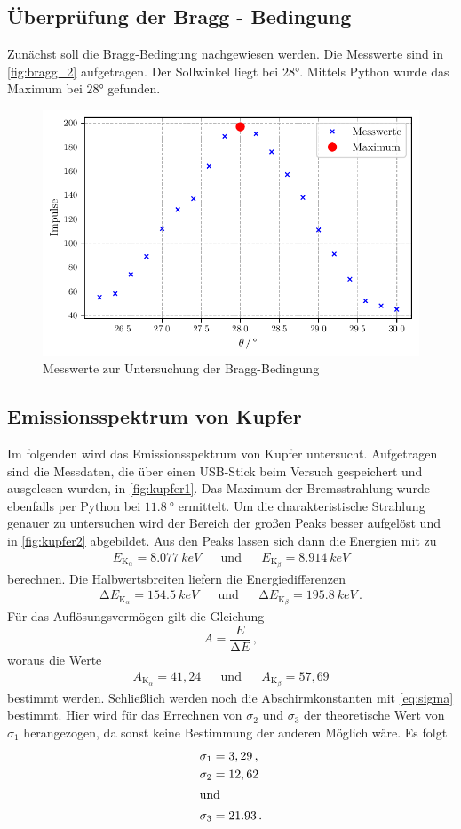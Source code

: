 \subsection{Überprüfung der Bragg - Bedingung}
Zunächst soll die Bragg-Bedingung nachgewiesen werden.
Die Messwerte sind in \autoref{fig:bragg_2} aufgetragen.
Der Sollwinkel liegt bei $28°$.
Mittels Python wurde das Maximum bei $28°$ gefunden.

\begin{figure}
  \centering
  \caption{Messwerte zur Untersuchung der Bragg-Bedingung}
  \label{fig:bragg_2}
  \includegraphics[width=0.5 \linewidth]{build/bragg.pdf}
\end{figure}

\subsection{Emissionsspektrum von Kupfer}
Im folgenden wird das Emissionsspektrum von Kupfer untersucht.
Aufgetragen sind die Messdaten, die über einen USB-Stick beim Versuch gespeichert und ausgelesen wurden, in \autoref{fig:kupfer1}.
Das Maximum der Bremsstrahlung wurde ebenfalls per Python bei $\qty{11.8}{°}$ ermittelt.  
Um die charakteristische Strahlung genauer zu untersuchen wird der Bereich der großen Peaks besser aufgelöst und in \autoref{fig:kupfer2} abgebildet.
Aus den Peaks lassen sich dann die Energien mit zu
\begin{align*}
  E_{\text{K}_\alpha} = \qty{8.077}{keV} &&\text{und}&& E_{\text{K}_\beta} = \qty{8.914}{keV}
\end{align*}
berechnen.
Die Halbwertsbreiten liefern die Energiedifferenzen
\begin{align*}
  \increment E_{\text{K}_\alpha} = \qty{154.5}{keV} &&\text{und}&& \increment E_{\text{K}_\beta} = \qty{195.8}{keV} \, .
\end{align*}
Für das Auflösungsvermögen gilt die Gleichung
\begin{equation*}
  A = \frac{E}{\increment E} \, ,
\end{equation*}
woraus die Werte
\begin{align*}
  A_{\text{K}_\alpha} = 41,24 && \text{und} && A_{\text{K}_\beta} = 57,69
\end{align*}
bestimmt werden.
Schließlich werden noch die Abschirmkonstanten mit \autoref{eq:sigma} bestimmt.
Hier wird für das Errechnen von $\sigma_2$ und $\sigma_3$ der theoretische Wert von $\sigma_1$ herangezogen, da sonst keine Bestimmung der anderen Möglich wäre. 
Es folgt
\begin{align*}
  \sigma_{1} &= 3,29 \, ,\\
  \sigma_{2} &= 12,62 \\ 
  \intertext{und}
  \sigma_{3} &= 21.93 \, .
\end{align*}

